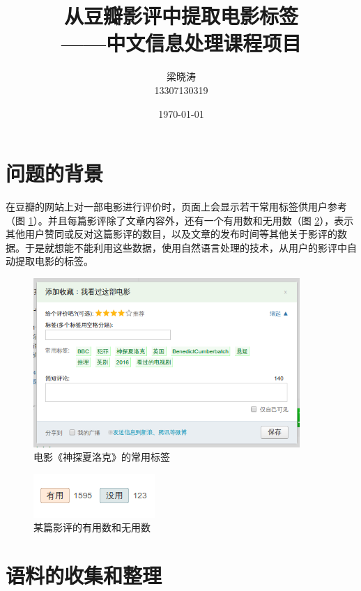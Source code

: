 \documentclass[a4paper, nofonts, nocap]{ctexart}
\begin{document}
\title{从豆瓣影评中提取电影标签 \\ \large ——中文信息处理课程项目}
\author{梁晓涛 \\ \small 13307130319}
\date{\today}
\maketitle

\tableofcontents
\newpage

\section{问题的背景}
在豆瓣的网站上对一部电影进行评价时，页面上会显示若干常用标签供用户参考（图 \ref{fig:douban}）。并且每篇影评除了文章内容外，还有一个有用数和无用数（图 \ref{fig:useful}），表示其他用户赞同或反对这篇影评的数目，以及文章的发布时间等其他关于影评的数据。于是就想能不能利用这些数据，使用自然语言处理的技术，从用户的影评中自动提取电影的标签。
\begin{figure}[ht]
	\centering
	\includegraphics[width=0.9\textwidth]{images/douban.png}
	\caption{电影《神探夏洛克》的常用标签}
	\label{fig:douban}
\end{figure}

\begin{figure}[ht]
	\centering
	\includegraphics[scale=0.8]{images/useful.png}
	\caption{某篇影评的有用数和无用数}
	\label{fig:useful}
\end{figure}

\section{语料的收集和整理}
\end{document}
